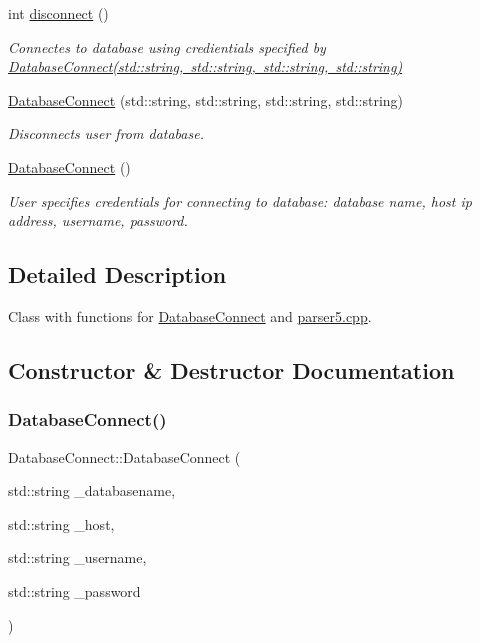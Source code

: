 \begin{DoxyCompactItemize}
int \mbox{\hyperlink{classDatabaseConnect_a1a276c7ee1c41f1ba38ff6e31f804f83}{disconnect}} ()
\begin{DoxyCompactList}\small\item\em Connectes to database using credientials specified by \mbox{\hyperlink{classDatabaseConnect_ad4273735005641691826765240a1dfb8}{Database\+Connect(std\+::string, std\+::string, std\+::string, std\+::string)}} \end{DoxyCompactList}\item 
\mbox{\hyperlink{classDatabaseConnect_ad4273735005641691826765240a1dfb8}{Database\+Connect}} (std\+::string, std\+::string, std\+::string, std\+::string)
\begin{DoxyCompactList}\small\item\em Disconnects user from database. \end{DoxyCompactList}\item 
\mbox{\hyperlink{classDatabaseConnect_a5f6ea02e82b1b8463d8c8053ef811e1f}{Database\+Connect}} ()
\begin{DoxyCompactList}\small\item\em User specifies credentials for connecting to database\+: database name, host ip address, username, password. \end{DoxyCompactList}\end{DoxyCompactItemize}


\subsection{Detailed Description}
Class with functions for \mbox{\hyperlink{classDatabaseConnect}{Database\+Connect}} and \mbox{\hyperlink{parser5_8cpp}{parser5.\+cpp}}. 

\subsection{Constructor \& Destructor Documentation}
\mbox{\label{classDatabaseConnect_ad4273735005641691826765240a1dfb8}} 
\subsubsection{\texorpdfstring{Database\+Connect()}{DatabaseConnect()}\hspace{0.1cm}{\footnotesize\ttfamily [1/2]}}
{\footnotesize\ttfamily Database\+Connect\+::\+Database\+Connect (\begin{DoxyParamCaption}\item[{std\+::string}]{\+\_\+databasename,  }\item[{std\+::string}]{\+\_\+host,  }\item[{std\+::string}]{\+\_\+username,  }\item[{std\+::string}]{\+\_\+password }\end{DoxyParamCaption})}



